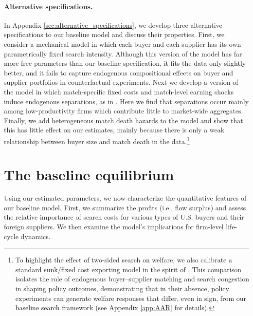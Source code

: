 \documentclass[12pt]{article} \usepackage{amsmath,amssymb,amsthm,geometry,graphicx,setspace,algorithm,algpseudocode,float}
\begin{document}
\paragraph{Alternative specifications.} In Appendix \ref{sec:alternative_specifications}, we develop three alternative specifications to our baseline model and discuss their properties.  First, we consider a mechanical model in which each buyer and each supplier has its own parametrically fixed search intensity. Although this version of the model has far more free parameters than our baseline specification, it fits the data only slightly better, and it fails to capture endogenous compositional effects on buyer and supplier portfolios in counterfactual experiments.  Next we develop a version of the model in which match-specific fixed costs and match-level earning shocks induce endogenous separations, as in \citet{MortensenPissarides1994}. Here we find that separations occur mainly among low-productivity firms which contribute little to market-wide aggregates.  Finally, we add heterogeneous match death hazards to the model and show that this has little effect on our estimates, mainly because there is only a weak relationship between buyer size and match death in the data.\footnote{\label{footnote:AAR} To highlight the effect of two-sided search on welfare, we also calibrate a standard sunk/fixed cost exporting model in the spirit of \citet{AlessandriaArkolakisRuhl2020}. This comparison isolates the role of endogenous buyer–supplier matching and search congestion in shaping policy outcomes, demonstrating that in their absence, policy experiments can generate welfare responses that differ, even in sign, from our baseline search framework (see Appendix \ref{app:AAR} for details)\medskip.}

\section{The baseline equilibrium}
Using our estimated parameters, we now characterize the quantitative features of our baseline model. First, we summarize the profits (i.e., flow surplus) and assess the relative importance of search costs for various types of U.S. buyers and their foreign suppliers. We then examine the model's implications for firm-level life-cycle dynamics.
\end{document}

